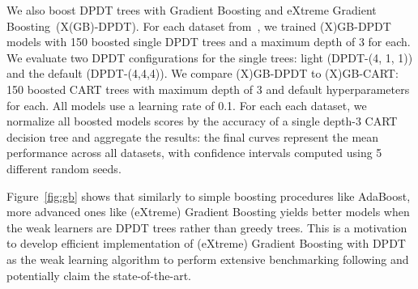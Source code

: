 We also boost DPDT trees with Gradient Boosting and eXtreme Gradient Boosting~\cite{FriedmanBoosting,stcohFriedman,xgb}(X(GB)-DPDT). For each dataset from~\cite{grinsztajn2022tree}, we trained (X)GB-DPDT models with 150 boosted single DPDT trees and a maximum depth of 3 for each. We evaluate two DPDT configurations for the single trees: light (DPDT-(4, 1, 1)) and the default (DPDT-(4,4,4)). We compare (X)GB-DPDT to (X)GB-CART: 150 boosted CART trees with maximum depth of 3 and default hyperparameters for each. All models use a learning rate of 0.1. For each each dataset, we normalize all boosted models scores by the accuracy of a single depth-3 CART decision tree and aggregate the results: the final curves represent the mean performance across all datasets, with confidence intervals computed using 5 different random seeds.

Figure~\ref{fig:gb} shows that similarly to simple boosting procedures like AdaBoost, more advanced ones like (eXtreme) Gradient Boosting yields better models when the weak learners are DPDT trees rather than greedy trees. This is a motivation to develop efficient implementation of (eXtreme) Gradient Boosting with DPDT as the weak learning algorithm to perform extensive benchmarking following \cite{grinsztajn2022tree} and potentially claim the state-of-the-art.

